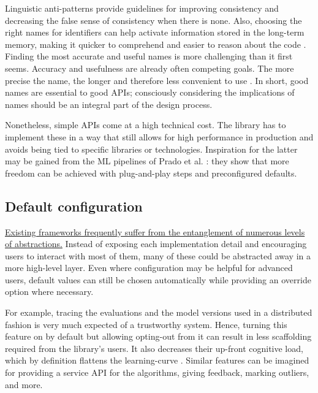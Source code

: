 Linguistic anti-patterns provide guidelines for improving consistency and decreasing the false sense of consistency when there is none. Also, choosing the right names for identifiers can help activate information stored in the long-term memory, making it quicker to comprehend and easier to reason about the code \cite{deissenboeck2006concise}. Finding the most accurate and useful names is more challenging than it first seems. Accuracy and usefulness are already often competing goals. The more precise the name, the longer and therefore less convenient to use \cite{butler2009relating}. In short, good names are essential to good APIs; consciously considering the implications of names should be an integral part of the design process.

Nonetheless, simple APIs come at a high technical cost. The library has to implement these in a way that still allows for high performance in production \cite{kleppmann2017designing} and avoids being tied to specific libraries or technologies. Inspiration for the latter may be gained from the ML pipelines of Prado et al. \cite{prado2020bonseyes}: they show that more freedom can be achieved with plug-and-play steps and preconfigured defaults. 

\subsection{Default configuration}

\href{https://grugbrain.dev/#grug-on-apis}{Existing frameworks frequently suffer from the entanglement of numerous levels of abstractions.} Instead of exposing each implementation detail and encouraging users to interact with most of them, many of these could be abstracted away in a more high-level layer. Even where configuration may be helpful for advanced users, default values can still be chosen automatically while providing an override option where necessary.

For example, tracing the evaluations and the model versions used in a distributed fashion is very much expected of a trustworthy system. Hence, turning this feature on by default but allowing opting-out from it can result in less scaffolding required from the library's users. It also decreases their up-front cognitive load, which by definition flattens the learning-curve \cite{hermans2021programmer}. Similar features can be imagined for providing a service API for the algorithms, giving feedback, marking outliers, and more.

